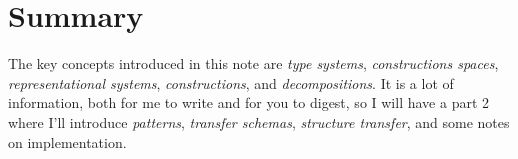 \documentclass[a4paper]{article}
\theoremstyle{definition}
\newtheorem{definition}{Definition}
\begin{document}
		\section{Summary}
		The key concepts introduced in this note are \textit{type systems}, \textit{constructions spaces}, \textit{representational systems}, \textit{constructions}, and \textit{decompositions}. It is a lot of information, both for me to write and for you to digest, so I will have a part 2 where I'll introduce \textit{patterns}, \textit{transfer schemas}, \textit{structure transfer}, and some notes on implementation.

%
%
\end{document}
